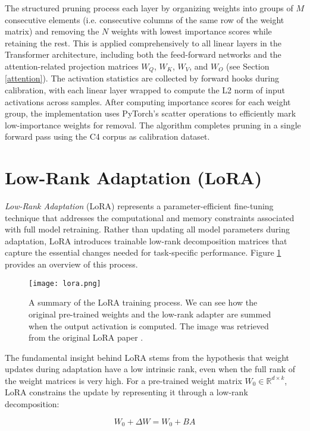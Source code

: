The structured pruning process each layer by organizing weights into groups of $M$ consecutive elements (i.e. consecutive columns of the same row of the weight matrix) and removing the $N$ weights with lowest importance scores while retaining the rest. This is applied comprehensively to all linear layers in the Transformer architecture, including both the feed-forward networks and the attention-related projection matrices $W_Q$, $W_K$, $W_V$, and $W_O$ (see Section \ref{attention}). The activation statistics are collected by forward hooks during calibration, with each linear layer wrapped to compute the L2 norm of input activations across samples. After computing importance scores for each weight group, the implementation uses PyTorch's scatter operations to efficiently mark low-importance weights for removal. The algorithm completes pruning in a single forward pass using the C4 corpus \cite{c4} as calibration dataset.

\section{Low-Rank Adaptation (LoRA)} \label{lora}

\textit{Low-Rank Adaptation} (LoRA) \cite{lora} represents a parameter-efficient fine-tuning technique that addresses the computational and memory constraints associated with full model retraining. Rather than updating all model parameters during adaptation, LoRA introduces trainable low-rank decomposition matrices that capture the essential changes needed for task-specific performance. Figure \ref{fig:lora} provides an overview of this process.

\begin{figure}[htbp]
    \centering
    \texttt{[image: lora.png]}
    \caption[LoRA Overview]{A summary of the LoRA training process. We can see how the original pre-trained weights and the low-rank adapter are summed when the output activation is computed. The image was retrieved from the original LoRA paper \cite{lora}.}
    \label{fig:lora}
\end{figure}

The fundamental insight behind LoRA stems from the hypothesis that weight updates during adaptation have a low intrinsic rank, even when the full rank of the weight matrices is very high. For a pre-trained weight matrix $W_0 \in \mathbb{R}^{d \times k}$, LoRA constrains the update by representing it through a low-rank decomposition:

\begin{equation}
W_0 + \Delta W = W_0 + BA
\end{equation}

